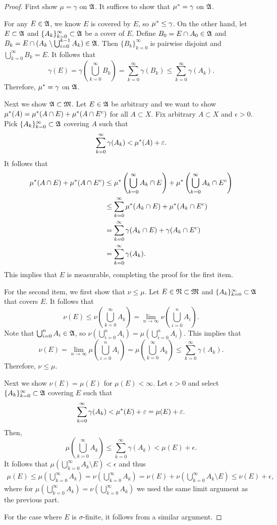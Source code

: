 \documentclass[a4paper]{article}
\renewcommand{\cupinfk}{\bigcup_{k=0}^\infty}
\renewcommand{\suminfk}{\sum_{k=0}^\infty}
\renewcommand{\seqinfk}[1]{\{ #1 \}_{k=0}^\infty}
\renewcommand{\cupi}{\bigcup_{i=0}}
\begin{document}
\begin{proof}
First show $\mu = \gamma$ on $\mathfrak{A}$.
It suffices to show that $\mu^* = \gamma$ on $\mathfrak{A}$.

For any $E \in \mathfrak{A}$, we know $E$ is covered by $E$, so
$\mu^* \leq \gamma$. On the other hand, let $E \subset \mathfrak{A}$
and $\seqinfk{A_k} \subset \afk$ be a cover of $E$.
Define $B_0 = E \cap A_0 \in \mathfrak{A}$ and
$B_k = E \cap (A_k \setminus \cupi^{k-1} A_k) \in \afk$.
Then $\seqinfk{B_k}$ is pairwise disjoint and
$\cupinfk B_k = E$. It follows that
\[
\gamma(E) = \gamma \left( \cupinfk B_k \right)
= \suminfk \gamma(B_k) \leq \suminfk \gamma(A_k).
\]
Therefore, $\mu^* = \gamma$ on $\mathfrak{A}$.

Next we show $\mathfrak{A} \subset \mathfrak{M}$. Let $E \in \mathfrak{A}$
be arbitrary and we want to show $\mu^*(A)
= \mu^*(A \cap E) + \mu^* (A \cap E^c)$ for all
$A \subset X$. Fix arbitrary $A \subset X$ and
$\epsilon > 0$. Pick $\seqinfk{A_k} \subset \afk$
covering $A$ such that
\[
\suminfk \gamma (A_k) < \om(A) + \epsilon.
\]
It follows that
\[
\begin{aligned}
\om(A \cap E) + \om(A \cap E^c)
&\leq \om \left( \cupinfk A_k \cap E \right)
+ \om \left( \cupinfk A_k \cap E^c \right) \\
&\leq \suminfk \om(A_k \cap E) + \om(A_k \cap E^c) \\
&= \suminfk \gamma(A_k \cap E) + \gamma(A_k \cap E^c) \\
&= \suminfk \gamma(A_k).
\end{aligned}
\]
This implies that $E$ is measurable, completing the proof
for the first item.

For the second item, we first show that $\nu \leq \mu$.
Let $E \in \mathfrak{N} \subset \mathfrak{M}$ and $\seqinfk{A_k} \subset \afk$
that covers $E$. It follows that
\[
\nu(E) \leq \nu \left( \cupinfk A_k \right)
= \lim_{n \to \infty} \nu \left( \cupi^n A_i \right).
\]
Note that $\cupi^n A_i \in \afk$, so
$\nu \left( \cupi^n A_i \right) = \mu \left( \cupi^n
A_i \right)$. This implies that
\[
\nu(E) = \lim_{n \to \infty} \mu \left( \cupi^n A_i \right)
= \mu \left( \cupinfk A_k \right) \leq \suminfk \gamma(A_k).
\]
Therefore, $\nu \leq \mu$.

Next we show $\nu(E) = \mu(E)$ for $\mu(E) < \infty$.
Let $\epsilon > 0$ and select $\seqinfk{A_k} \subset \afk$
covering $E$ such that
\[
\suminfk \gamma(A_k) < \om(E) + \epsilon = \mu(E) + \epsilon.
\]
Then,
\[
\mu \left( \cupinfk A_k \right)
\leq \suminfk \gamma(A_k) < \mu(E) + \epsilon.
\]
It follows that $\mu \left( \cupinfk A_k \setminus E \right)
< \epsilon$ and thus
\[
\begin{aligned}
\mu(E)
\leq \mu \left( \cupinfk A_k \right)
= \nu \left( \cupinfk A_k \right)
= \nu (E) + \nu \left( \cupinfk A_k \setminus E \right)
\leq \nu(E) + \epsilon,
\end{aligned}
\]
where for $\mu \left( \cupinfk A_k \right)
= \nu \left( \cupinfk A_k \right)$ we used the same limit argument
as the previous part.

For the case where $E$ is $\sigma$-finite, it follows from
a similar argument.

\end{proof}
\end{document}

